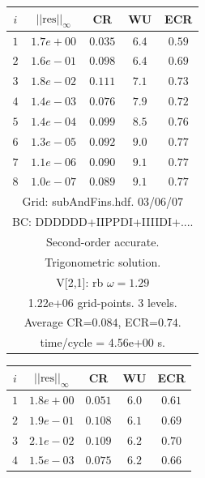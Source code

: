 \begin{table}[hbt]
\begin{center}
\begin{tabular}{|c|c|c|c|c|} \hline 
 $i$   & $\vert\vert\mbox{res}\vert\vert_\infty$  &  CR     &  WU    & ECR  \\   \hline 
 $ 1$  & $ 1.7e+00$ & $0.035$ & $ 6.4$ & $0.59$ \\ 
 $ 2$  & $ 1.6e-01$ & $0.098$ & $ 6.4$ & $0.69$ \\ 
 $ 3$  & $ 1.8e-02$ & $0.111$ & $ 7.1$ & $0.73$ \\ 
 $ 4$  & $ 1.4e-03$ & $0.076$ & $ 7.9$ & $0.72$ \\ 
 $ 5$  & $ 1.4e-04$ & $0.099$ & $ 8.5$ & $0.76$ \\ 
 $ 6$  & $ 1.3e-05$ & $0.092$ & $ 9.0$ & $0.77$ \\ 
 $ 7$  & $ 1.1e-06$ & $0.090$ & $ 9.1$ & $0.77$ \\ 
 $ 8$  & $ 1.0e-07$ & $0.089$ & $ 9.1$ & $0.77$ \\ 
\hline 
\multicolumn{5}{|c|}{Grid: subAndFins.hdf. 03/06/07}  \\
\multicolumn{5}{|c|}{BC: DDDDDD+IIPPDI+IIIIDI+....}  \\
\multicolumn{5}{|c|}{Second-order accurate.}  \\
\multicolumn{5}{|c|}{Trigonometric solution.}  \\
\multicolumn{5}{|c|}{V[2,1]: rb $\omega=1.29$}  \\
\multicolumn{5}{|c|}{1.22e+06 grid-points. 3 levels.}  \\
\multicolumn{5}{|c|}{Average CR=$0.084$, ECR=$0.74$.}  \\
\multicolumn{5}{|c|}{time/cycle = 4.56e+00 s.}  \\
\hline 
\end{tabular}
\qquad
\begin{tabular}{|c|c|c|c|c|} \hline 
 $i$   & $\vert\vert\mbox{res}\vert\vert_\infty$  &  CR     &  WU    & ECR  \\   \hline 
 $ 1$  & $ 1.8e+00$ & $0.051$ & $ 6.0$ & $0.61$ \\ 
 $ 2$  & $ 1.9e-01$ & $0.108$ & $ 6.1$ & $0.69$ \\ 
 $ 3$  & $ 2.1e-02$ & $0.109$ & $ 6.2$ & $0.70$ \\ 
 $ 4$  & $ 1.5e-03$ & $0.075$ & $ 6.2$ & $0.66$ \\ 

\end{tabular}
\end{center}
\end{table}
